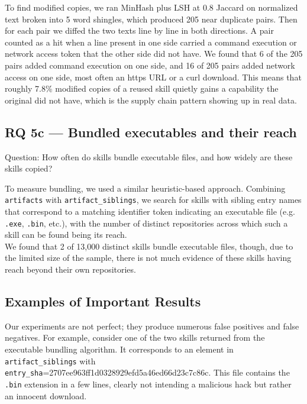 \documentclass[sigconf,review]{acmart}
\begin{document}
To find modified copies, we ran MinHash plus LSH at 0.8 Jaccard on normalized text broken into 5 word shingles, which produced 205 near duplicate pairs. Then for each pair we diffed the two texts line by line in both directions. A pair counted as a hit when a line present in one side carried a command execution or network access token that the other side did not have. We found that 6 of the 205 pairs added command execution on one side, and 16 of 205 pairs added network access on one side, most often an https URL or a curl download. This means that roughly 7.8\% modified copies of a reused skill quietly gains a capability the original did not have, which is the supply chain pattern showing up in real data.

\subsection{RQ 5c — Bundled executables and their reach}
\begin{center}
    Question: How often do skills bundle executable files, and how widely are these skills 
copied? 
\end{center}

To measure bundling, we used a similar heuristic-based approach. Combining \texttt{artifacts} with \texttt{artifact\_siblings}, we search for skills with sibling entry names that correspond to a matching identifier token indicating an executable file (e.g. \texttt{.exe}, \texttt{.bin}, etc.), with the number of distinct repositories across which such a skill can be found being its reach. \\ 
We found that 2 of 13,000 distinct skills bundle executable files, though, due to the limited size of the sample, there is not much evidence of these skills having reach beyond their own repositories.

\subsection{Examples of Important Results}
Our experiments are not perfect; they produce numerous false positives and false negatives. For example, consider one of the two skills returned from the executable bundling algorithm. It corresponds to an element in \texttt{artifact\_siblings} with \\ \texttt{entry\_sha}=2707ee963ff1d0328929efd5a46ed66d23c7c86c. This file contains the \texttt{.bin} extension in a few lines, clearly not intending a malicious hack but rather an innocent download.
\end{document}
